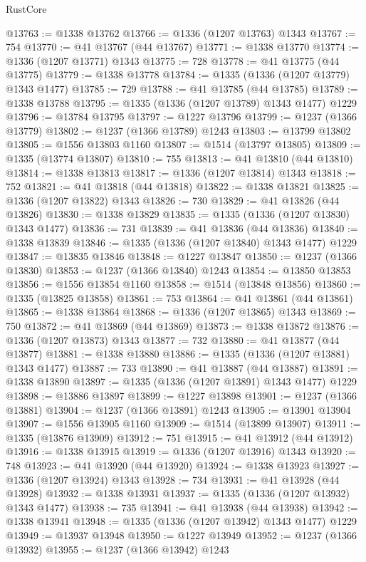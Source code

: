 \begin{lexlean}{RustCore}
\begin{coremodule}
@13763 := @1338 @13762
@13766 := @1336 (@1207 @13763) @1343
@13767 := 754
@13770 := @41 @13767 (@44 @13767)
@13771 := @1338 @13770
@13774 := @1336 (@1207 @13771) @1343
@13775 := 728
@13778 := @41 @13775 (@44 @13775)
@13779 := @1338 @13778
@13784 := @1335 (@1336 (@1207 @13779) @1343 @1477)
@13785 := 729
@13788 := @41 @13785 (@44 @13785)
@13789 := @1338 @13788
@13795 := @1335 (@1336 (@1207 @13789) @1343 @1477) @1229
@13796 := @13784 @13795
@13797 := @1227 @13796
@13799 := @1237 (@1366 @13779)
@13802 := @1237 (@1366 @13789) @1243
@13803 := @13799 @13802
@13805 := @1556 @13803 @1160
@13807 := @1514 (@13797 @13805)
@13809 := @1335 (@13774 @13807)
@13810 := 755
@13813 := @41 @13810 (@44 @13810)
@13814 := @1338 @13813
@13817 := @1336 (@1207 @13814) @1343
@13818 := 752
@13821 := @41 @13818 (@44 @13818)
@13822 := @1338 @13821
@13825 := @1336 (@1207 @13822) @1343
@13826 := 730
@13829 := @41 @13826 (@44 @13826)
@13830 := @1338 @13829
@13835 := @1335 (@1336 (@1207 @13830) @1343 @1477)
@13836 := 731
@13839 := @41 @13836 (@44 @13836)
@13840 := @1338 @13839
@13846 := @1335 (@1336 (@1207 @13840) @1343 @1477) @1229
@13847 := @13835 @13846
@13848 := @1227 @13847
@13850 := @1237 (@1366 @13830)
@13853 := @1237 (@1366 @13840) @1243
@13854 := @13850 @13853
@13856 := @1556 @13854 @1160
@13858 := @1514 (@13848 @13856)
@13860 := @1335 (@13825 @13858)
@13861 := 753
@13864 := @41 @13861 (@44 @13861)
@13865 := @1338 @13864
@13868 := @1336 (@1207 @13865) @1343
@13869 := 750
@13872 := @41 @13869 (@44 @13869)
@13873 := @1338 @13872
@13876 := @1336 (@1207 @13873) @1343
@13877 := 732
@13880 := @41 @13877 (@44 @13877)
@13881 := @1338 @13880
@13886 := @1335 (@1336 (@1207 @13881) @1343 @1477)
@13887 := 733
@13890 := @41 @13887 (@44 @13887)
@13891 := @1338 @13890
@13897 := @1335 (@1336 (@1207 @13891) @1343 @1477) @1229
@13898 := @13886 @13897
@13899 := @1227 @13898
@13901 := @1237 (@1366 @13881)
@13904 := @1237 (@1366 @13891) @1243
@13905 := @13901 @13904
@13907 := @1556 @13905 @1160
@13909 := @1514 (@13899 @13907)
@13911 := @1335 (@13876 @13909)
@13912 := 751
@13915 := @41 @13912 (@44 @13912)
@13916 := @1338 @13915
@13919 := @1336 (@1207 @13916) @1343
@13920 := 748
@13923 := @41 @13920 (@44 @13920)
@13924 := @1338 @13923
@13927 := @1336 (@1207 @13924) @1343
@13928 := 734
@13931 := @41 @13928 (@44 @13928)
@13932 := @1338 @13931
@13937 := @1335 (@1336 (@1207 @13932) @1343 @1477)
@13938 := 735
@13941 := @41 @13938 (@44 @13938)
@13942 := @1338 @13941
@13948 := @1335 (@1336 (@1207 @13942) @1343 @1477) @1229
@13949 := @13937 @13948
@13950 := @1227 @13949
@13952 := @1237 (@1366 @13932)
@13955 := @1237 (@1366 @13942) @1243

\end{coremodule}
\end{lexlean}
